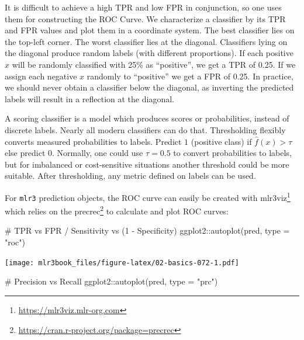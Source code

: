 \documentclass[12pt,]{scrbook}
\newenvironment{Shaded}{}{}
\newcommand{\CommentTok}[1]{\textcolor[rgb]{0.00,0.50,0.00}{#1}}
\newcommand{\DataTypeTok}[1]{#1}
\newcommand{\KeywordTok}[1]{\textcolor[rgb]{0.00,0.00,1.00}{#1}}
\newcommand{\NormalTok}[1]{#1}
\newcommand{\OperatorTok}[1]{#1}
\newcommand{\StringTok}[1]{\textcolor[rgb]{0.00,0.50,0.50}{#1}}
\renewcommand{\href}[2]{#2\footnote{\url{#1}}}
\begin{document}
It is difficult to achieve a high TPR and low FPR in conjunction, so one uses them for constructing the ROC Curve.
We characterize a classifier by its TPR and FPR values and plot them in a coordinate system.
The best classifier lies on the top-left corner.
The worst classifier lies at the diagonal.
Classifiers lying on the diagonal produce random labels (with different proportions).
If each positive \(x\) will be randomly classified with 25\% as ``positive'', we get a TPR of 0.25.
If we assign each negative \(x\) randomly to ``positive'' we get a FPR of 0.25.
In practice, we should never obtain a classifier below the diagonal, as inverting the predicted labels will result in a reflection at the diagonal.

A scoring classifier is a model which produces scores or probabilities, instead of discrete labels.
Nearly all modern classifiers can do that.
Thresholding flexibly converts measured probabilities to labels.
Predict \(1\) (positive class) if \(\hat{f}(x) > \tau\) else predict \(0\).
Normally, one could use \(\tau = 0.5\) to convert probabilities to labels, but for imbalanced or cost-sensitive situations another threshold could be more suitable.
After thresholding, any metric defined on labels can be used.

For \texttt{mlr3} prediction objects, the ROC curve can easily be created with \href{https://mlr3viz.mlr-org.com}{mlr3viz} which relies on the \href{https://cran.r-project.org/package=precrec}{precrec} to calculate and plot ROC curves:

\begin{Shaded}
\begin{Highlighting}[]
\CommentTok{# TPR vs FPR / Sensitivity vs (1 - Specificity)}
\NormalTok{ggplot2}\OperatorTok{::}\KeywordTok{autoplot}\NormalTok{(pred, }\DataTypeTok{type =} \StringTok{"roc"}\NormalTok{)}
\end{Highlighting}
\end{Shaded}

\texttt{[image: mlr3book\_files/figure-latex/02-basics-072-1.pdf]}

\begin{Shaded}
\begin{Highlighting}[]

\CommentTok{# Precision vs Recall}
\NormalTok{ggplot2}\OperatorTok{::}\KeywordTok{autoplot}\NormalTok{(pred, }\DataTypeTok{type =} \StringTok{"prc"}\NormalTok{)}
\end{Highlighting}
\end{Shaded}
\end{document}
